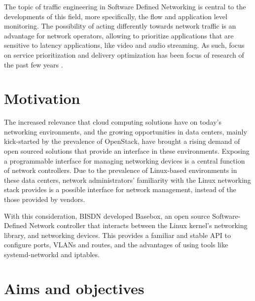 \par The topic of traffic engineering in Software Defined Networking is central to the developments of this field, more specifically, the flow and application level
monitoring. The possibility of acting differently towards network traffic is an advantage for network operators, allowing to prioritize applications that are
sensitive to latency applications, like video and audio streaming. As such, focus on service prioritization and delivery optimization has been focus of research 
of the past few years \cite{bakhshi_user-centric_2017}.

\section {Motivation}


The increased relevance that cloud computing solutions have on today's networking environments, and the growing opportunities in data centers, mainly
kick-started by the prevalence of OpenStack, have brought a rising demand of open sourced solutions that provide an interface in these environments. Exposing
a programmable interface for managing networking devices is a central function of network controllers. Due to the prevalence of Linux-based environments in these
data centers, network administrators' familiarity with the Linux networking stack provides is a possible interface for network management, instead of the those
provided by vendors.

\par With this consideration, BISDN developed Basebox, an open source Software-Defined Network controller that interacts between the Linux kernel's networking
library, and networking devices. This provides a familiar and stable API to configure ports, VLANs and routes, and the advantages of using tools like 
systemd-networkd and iptables.

\section {Aims and objectives}


